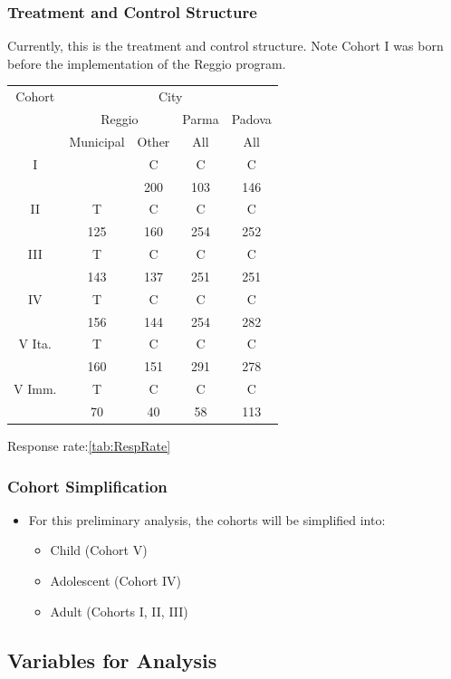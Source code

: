 \documentclass{beamer}
\begin{document}
\begin{frame}
	\frametitle{Treatment and Control Structure}
Currently, this is the treatment and control structure. Note Cohort I was born before the implementation of the Reggio program.

	\vspace{0.2cm}
	\centering
	\footnotesize
	\begin{tabular}{ccccc}
	\toprule
	Cohort & \multicolumn{4}{c}{City} \\
	 & \multicolumn{2}{c}{Reggio} & Parma & Padova \\
	 & Municipal & Other & All & All \\
	\midrule
	I &  & C & C & C \\
	& & 200 & 103 & 146 \\
	II & T & C & C & C \\
	& 125 & 160 & 254 & 252 \\
	III & T & C & C & C \\
	& 143 & 137 & 251 & 251 \\
	IV & T & C & C & C \\
	& 156 & 144 & 254 & 282 \\
	V Ita. & T & C & C & C \\
	& 160 & 151 & 291 & 278 \\
	V Imm. & T & C & C & C \\
	&  70 &  40 &  58 & 113 \\
	\bottomrule
	\end{tabular}

{Response rate}:\ref{tab:RespRate}
\end{frame}


\begin{frame}
	\frametitle{Cohort Simplification}
	\begin{itemize}
		\item For this preliminary analysis, the cohorts will be simplified into:
		\begin{itemize}
			\item Child (Cohort V)
			\item Adolescent (Cohort IV)
			\item Adult (Cohorts I, II, III)
		\end{itemize}
	\end{itemize}
\end{frame}


\subsection{Variables for Analysis}
\end{document}
